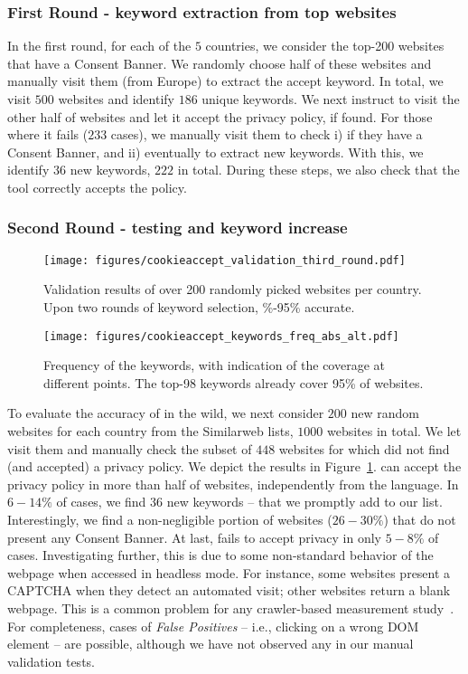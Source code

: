 \subsubsection{First Round - keyword extraction from top websites}

In the first round, for each of the $5$ countries, we consider the top-200 websites that have a Consent Banner. We randomly choose half of these websites and manually visit them (from Europe) to extract the accept keyword. In total, we visit $500$ websites and identify $186$ unique keywords. We next instruct \TOOL to visit the other half of websites and let it accept the privacy policy, if found. For those where it fails ($233$ cases), we manually visit them to check i) if they have a Consent Banner, and ii) eventually to extract new keywords. With this, we identify $36$ new keywords, $222$ in total. During these steps, we also check that the tool correctly accepts the policy.

\subsubsection{Second Round - testing and keyword increase}

\begin{figure}[t]
    \centering
    \texttt{[image: figures/cookieaccept\_validation\_third\_round.pdf]}
    \caption{Validation results of \TOOL over 200 randomly picked websites per country. Upon two rounds of keyword selection, \%-95\% accurate. }
    \label{fig:validation}
\end{figure}

\begin{figure}[t]
    \centering
    \texttt{[image: figures/cookieaccept\_keywords\_freq\_abs\_alt.pdf]}
    \caption{Frequency of the \TOOL keywords, with indication of the coverage at different points. The top-98 keywords already cover 95\% of websites.}
    \label{fig:keywords}
\end{figure}

To evaluate the accuracy of \TOOL in the wild, we next consider $200$ new random websites for each country from the Similarweb lists, $1000$ websites in total. We let \TOOL visit them and manually check the subset of $448$ websites for which \TOOL did not find (and accepted) a privacy policy. We depict the results in Figure~\ref{fig:validation}. \TOOL can accept the privacy policy in more than half of websites, independently from the language. In $6-14\%$ of cases, we find 36 new keywords -- that we promptly add to our list. Interestingly, we find a non-negligible portion of websites ($26-30\%$) that do not present any Consent Banner. At last, \TOOL fails to accept privacy in only $5-8\%$ of cases. Investigating further, this is due to some non-standard behavior of the webpage when accessed in headless mode. For instance, some websites present a CAPTCHA when they detect an automated visit; other websites return a blank webpage. This is a common problem for any crawler-based measurement study~\cite{vastel2020fp}. For completeness, cases of \emph{False Positives} -- i.e., \TOOL clicking on a wrong DOM element -- are possible, although we have not observed any in our manual validation tests. 

